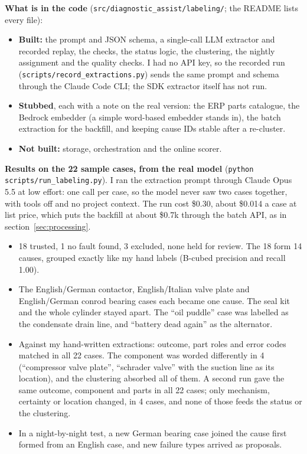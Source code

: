 \documentclass[11pt,a4paper]{article}
\newcommand{\code}[1]{\nolinkurl{#1}}
\begin{document}
\textbf{What is in the code} (\code{src/diagnostic_assist/labeling/}; the README lists every file):
\begin{itemize}
  \item \textbf{Built:} the prompt and JSON schema, a single-call LLM extractor and recorded replay, the checks, the status logic, the clustering, the nightly assignment and the quality checks. I had no API key, so the recorded run (\code{scripts/record_extractions.py}) sends the same prompt and schema through the Claude Code CLI; the SDK extractor itself has not run.
  \item \textbf{Stubbed}, each with a note on the real version: the ERP parts catalogue, the Bedrock embedder (a simple word-based embedder stands in), the batch extraction for the backfill, and keeping cause IDs stable after a re-cluster.
  \item \textbf{Not built:} storage, orchestration and the online scorer.
\end{itemize}

\textbf{Results on the 22 sample cases, from the real model} (\texttt{python scripts/run\_labeling.py}). I ran the extraction prompt through Claude Opus 5.5 at low effort: one call per case, so the model never saw two cases together, with tools off and no project context. The run cost \$0.30, about \$0.014 a case at list price, which puts the backfill at about \$0.7k through the batch API, as in section~\ref{sec:processing}.
\begin{itemize}
  \item 18 trusted, 1 no fault found, 3 excluded, none held for review. The 18 form 14 causes, grouped exactly like my hand labels (B-cubed precision and recall 1.00).
  \item The English/German contactor, English/Italian valve plate and English/German conrod bearing cases each became one cause. The seal kit and the whole cylinder stayed apart. The “oil puddle” case was labelled as the condensate drain line, and “battery dead again” as the alternator.
  \item Against my hand-written extractions: outcome, part roles and error codes matched in all 22 cases. The component was worded differently in 4 (“compressor valve plate”, “schrader valve” with the suction line as its location), and the clustering absorbed all of them. A second run gave the same outcome, component and parts in all 22 cases; only mechanism, certainty or location changed, in 4 cases, and none of those feeds the status or the clustering.
  \item In a night-by-night test, a new German bearing case joined the cause first formed from an English case, and new failure types arrived as proposals.
\end{itemize}
\end{document}
